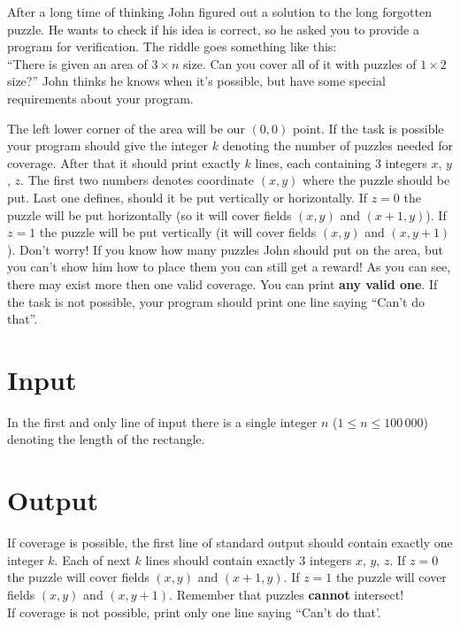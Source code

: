 \documentclass{spiral}
\begin{document}
  \makeheader

  After a long time of thinking John figured out a solution to the long forgotten puzzle.
  He wants to check if his idea is correct, so he asked you to provide a program for verification.
  The riddle goes something like this:\\
  ``There is given an area of $3 \times n$ size. Can you cover all of it with puzzles of $1 \times 2$ size?''
  John thinks he knows when it's possible, but have some special requirements about your program.

  The left lower corner of the area will be our $(0, 0)$ point.
  If the task is possible your program should give the integer $k$
  denoting the number of puzzles needed for coverage.
  After that it should print exactly $k$ lines, each containing 3 integers $x$, $y$, $z$.
  The first two numbers denotes coordinate $(x, y)$ where the puzzle should be put.
  Last one defines, should it be put vertically or horizontally.
  If $z = 0$ the puzzle will be put horizontally (so it will cover fields $(x, y)$ and $(x + 1, y)$).
  If $z = 1$ the puzzle will be put vertically (it will cover fields $(x, y)$ and $(x, y + 1)$).
  Don't worry! If you know how many puzzles John should put on the area,
  but you can't show him how to place them you can still get a reward!
  As you can see, there may exist more then one valid coverage. You can print \textbf{any valid one}.
  If the task is not possible, your program should print one line saying ``Can't do that''.


  \section{Input}

    In the first and only line of input there is
    a single integer $n$ ($1 \leq n \leq 100\,000$) denoting the length of the rectangle.

  \section{Output}

    If coverage is possible, the first line of standard output should contain exactly one integer $k$.
    Each of next $k$ lines should contain exactly 3 integers $x$, $y$, $z$.
    If $z = 0$ the puzzle will cover fields $(x, y)$ and $(x + 1, y)$.
    If $z = 1$ the puzzle will cover fields $(x, y)$ and $(x, y + 1)$.
    Remember that puzzles \textbf{cannot} intersect!\\
    If coverage is not possible, print only one line saying ``Can't do that'.
    

\end{document}
